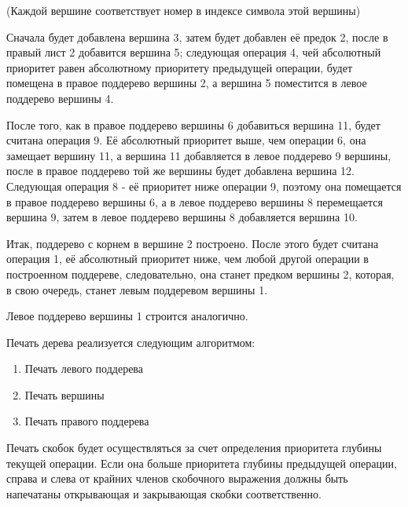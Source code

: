 \documentclass[a4paper]{article}
\newcounter{i}
\begin{document}
\begin{enumerate}[label=\textbf{\arabic*}.]
{\begin{center}
    \newline
    \newline
    (Каждой вершине соответствует номер в индексе символа этой вершины)
\end{center}

Сначала будет добавлена вершина 3, затем будет добавлен её предок 2, после в правый лист 2 добавится вершина 5;
следующая операция 4, чей абсолютный приоритет равен абсолютному приоритету предыдущей операции, будет помещена в правое поддерево вершины 2, 
а вершина 5 поместится в левое поддерево вершины 4.

После того, как в правое поддерево вершины 6 добавиться вершина 11, будет считана операция 9. Её абсолютный приоритет выше, чем операции 6, 
она замещает вершину 11, а вершина 11 добавляется в левое поддерево 9 вершины, после в правое поддерево той же вершины будет добавлена вершина 12.
Следующая операция 8 - её приоритет ниже операции 9, поэтому она помещается в правое поддерево вершины 6, а в левое поддерево вершины 8 перемещается вершина 9, 
затем в левое поддерево вершины 8 добавляется вершина 10.

Итак, поддерево с корнем в вершине 2 построено. После этого будет считана операция 1, её абсолютный приоритет ниже, чем любой другой операции в построенном поддереве,
следовательно, она станет предком вершины 2, которая, в свою очередь, станет левым поддеревом вершины 1. 

Левое поддерево вершины 1 строится аналогично.

\newpage

Печать дерева реализуется следующим алгоритмом:

\begin{enumerate}
    \item Печать левого поддерева
    \item Печать вершины
    \item Печать правого поддерева
\end{enumerate}

Печать скобок будет осуществляться за счет определения приоритета глубины текущей операции. 
Если она больше приоритета глубины предыдущей операции, справа и слева от крайних членов скобочного выражения должны быть напечатаны 
открывающая и закрывающая скобки соответственно.
\\

}
\end{enumerate}
\end{document}
